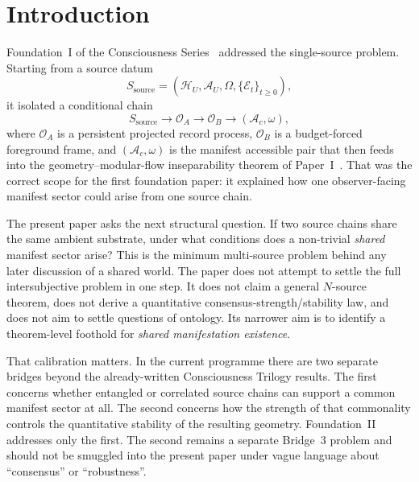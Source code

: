 \documentclass[12pt]{article}
\theoremstyle{definition}
\theoremstyle{remark}
\begin{document}
\begin{abstract}
This paper treats only the mathematical bridge from multi-source data to
shared accessible sectors. It does not claim a general \(N\)-source
theorem, does not provide a quantitative consensus--stability bound, and
does not derive the candidate shared sector from bare multi-source
dynamics alone. It also does not attempt to settle questions of
intersubjective ontology.
\end{abstract}

\clearpage
\tableofcontents
\clearpage

\section{Introduction}\label{sec:intro}

Foundation~I of the Consciousness Series~\cite{FoundationI} addressed
the single-source problem. Starting from a source datum
\[
S_{\mathrm{source}}
=
(\mathcal H_U,\mathcal A_U,\Omega,\{\mathcal E_t\}_{t\ge 0}),
\]
it isolated a conditional chain
\[
S_{\mathrm{source}}
\to
\mathcal O_A
\to
\mathcal O_B
\to
(\mathcal A_c,\omega),
\]
where \(\mathcal O_A\) is a persistent projected record process,
\(\mathcal O_B\) is a budget-forced foreground frame, and
\((\mathcal A_c,\omega)\) is the manifest accessible pair that then
feeds into the geometry--modular-flow inseparability theorem of
Paper~I~\cite{PaperI}. That was the correct scope for the first
foundation paper: it explained how one observer-facing manifest sector
could arise from one source chain.

The present paper asks the next structural question. If two source
chains share the same ambient substrate, under what conditions does a
non-trivial \emph{shared} manifest sector arise? This is the minimum
multi-source problem behind any later discussion of a shared world. The
paper does not attempt to settle the full intersubjective problem in one
step. It does not claim a general \(N\)-source theorem, does not derive
a quantitative consensus-strength/stability law, and does not aim to
settle questions of ontology. Its narrower aim is to identify a
theorem-level foothold for \emph{shared manifestation existence}.

That calibration matters. In the current programme there are two
separate bridges beyond the already-written Consciousness Trilogy
results. The first concerns whether entangled or correlated source
chains can support a common manifest sector at all. The second concerns
how the strength of that commonality controls the quantitative stability
of the resulting geometry. Foundation~II addresses only the first. The
second remains a separate Bridge~3 problem and should not be smuggled
into the present paper under vague language about ``consensus'' or
``robustness''.
\end{document}

